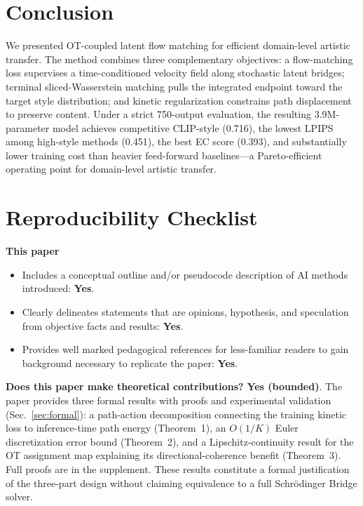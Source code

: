 ﻿\documentclass[letterpaper]{article}
\begin{document}
\section{Conclusion}
We presented OT-coupled latent flow matching for efficient domain-level artistic transfer. The method combines three complementary objectives: a flow-matching loss supervises a time-conditioned velocity field along stochastic latent bridges; terminal sliced-Wasserstein matching pulls the integrated endpoint toward the target style distribution; and kinetic regularization constrains path displacement to preserve content. Under a strict 750-output evaluation, the resulting 3.9M-parameter model achieves competitive CLIP-style (0.716), the lowest LPIPS among high-style methods (0.451), the best EC score (0.393), and substantially lower training cost than heavier feed-forward baselines---a Pareto-efficient operating point for domain-level artistic transfer.

\FloatBarrier


\clearpage
\small
\setlength{\itemsep}{1pt}
\setlength{\parskip}{2pt}
\section*{Reproducibility Checklist}
\noindent\textbf{This paper}
\begin{itemize}
\item Includes a conceptual outline and/or pseudocode description of AI methods introduced: \textbf{Yes}.
\item Clearly delineates statements that are opinions, hypothesis, and speculation from objective facts and results: \textbf{Yes}.
\item Provides well marked pedagogical references for less-familiar readers to gain background necessary to replicate the paper: \textbf{Yes}.
\end{itemize}

\noindent\textbf{Does this paper make theoretical contributions?} \textbf{Yes (bounded)}. The paper provides three formal results with proofs and experimental validation (Sec.~\ref{sec:formal}): a path-action decomposition connecting the training kinetic loss to inference-time path energy (Theorem~1), an $O(1/K)$ Euler discretization error bound (Theorem~2), and a Lipschitz-continuity result for the OT assignment map explaining its directional-coherence benefit (Theorem~3). Full proofs are in the supplement. These results constitute a formal justification of the three-part design without claiming equivalence to a full Schr\"odinger Bridge solver.
\end{document}
